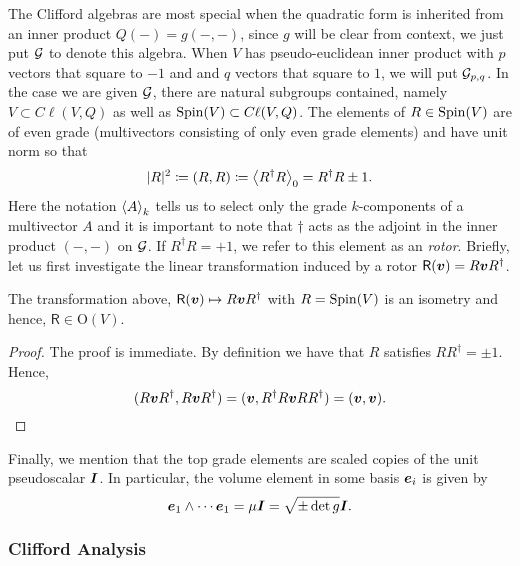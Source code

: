 \documentclass[conf]{new-aiaa}
\begin{document}
The Clifford algebras are most special when the quadratic form is inherited from an inner product $Q(-)=g(-,-)$, since $g$ will be clear from context, we just put $\G$ to denote this algebra. When $V$ has pseudo-euclidean inner product with $p$ vectors that square to $-1$ and and $q$ vectors that square to $1$, we will put $\G_{p,q}$. In the case we are given $\G$, there are natural subgroups contained, namely $V\subset C\ell(V,Q)$ as well as $\sping(V) \subset C\ell(V,Q)$. The elements of $R\in \sping(V)$ are of even grade (multivectors consisting of only even grade elements) and have unit norm so that 
\begin{equation}
|R|^2 \coloneqq (R,R) \coloneqq \proj{0}{R^\dagger R}= R^\dagger R\pm 1.
\end{equation}
Here the notation $\proj{k}{A}$ tells us to select only the grade $k$-components of a multivector $A$ and it is important to note that $\dagger$ acts as the adjoint in the inner product $(-,-)$ on $\G$. If $R^\dagger R = +1$, we refer to this element as an \emph{rotor}. Briefly, let us first investigate the linear transformation induced by a rotor $\mathsf{R}({\blade{v}})=R \blade{v} R^\dagger$. 
\begin{proposition}
\label{prop:orthogonal_transformation}
The transformation above, $\mathsf{R}(\blade{v}) \mapsto R\blade{v}R^\dagger$ with $R=\sping(V)$ is an isometry and hence, $\mathsf{R}\in \mathrm{O}(V)$.
\end{proposition}
\begin{proof}
The proof is immediate. By definition we have that $R$ satisfies $RR^\dagger = \pm 1$. Hence,
\begin{equation}
    (R\blade{v}R^\dagger,R\blade{v}R^\dagger) = (\blade{v},R^\dagger R \blade{v} RR^\dagger) = (\blade{v},\blade{v}).
\end{equation}
\end{proof}

Finally, we mention that the top grade elements are scaled copies of the unit pseudoscalar $\blade{I}$. In particular, the volume element in some basis $\blade{e}_i$ is given by
\begin{equation}
    \blade{e}_1 \wedge \cdots \blade{e}_1 = \mu \blade{I} = \sqrt{\pm \det g} \blade{I}.
\end{equation}


\subsubsection{Clifford Analysis}
\end{document}
